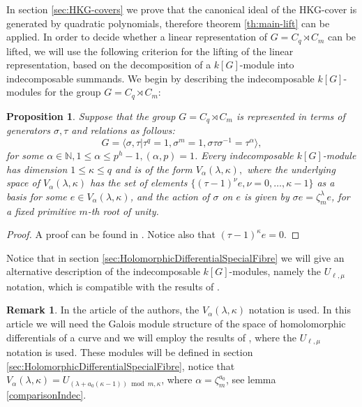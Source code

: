 \documentclass[11pt,letterpaper]{amsart}
\newtheorem{proposition}[theorem]{Proposition}
\theoremstyle{definition}
\newtheorem{remark}[theorem]{Remark}
\DeclareMathOperator\Aut{Aut}
\renewcommand{\mod}{\bmod}
\begin{document}
In section \ref{sec:HKG-covers} we prove that the canonical ideal of the HKG-cover is  generated by quadratic polynomials, therefore theorem \ref{th:main-lift} can be applied. In order to decide whether a linear representation of $G=C_q \rtimes C_m$ can be lifted, we will use the following criterion for the lifting of the linear representation, based on the decomposition of a $k[G]$-module into indecomposable summands. We begin  by describing the indecomposable 
$k[G]$-modules for the group $G=C_q \rtimes C_m$:
\begin{proposition}
Suppose that the group  $G=C_q \rtimes C_m$ is represented in terms of generators $\sigma,\tau$ and relations as follows:
\[
G=\langle \sigma,\tau | \tau^q=1, \sigma^m=1, \sigma \tau \sigma^{-1}= \tau^{\alpha}\rangle,
\]
for some  $\alpha\in \mathbb{N},
 1\leq \alpha \leq p^h-1, (\alpha, p)=1$.
Every indecomposable $k[G]$-module has dimension $1\leq \kappa \leq q$ and is of the form 
$
  V_{\alpha}(\lambda,\kappa),
$
where the underlying space of $V_{\alpha}(\lambda,\kappa)$ has the set of elements $\{(\tau-1)^\nu e, \nu=0,\ldots,\kappa-1\}$ as a basis for some $e\in V_\alpha(\lambda,\kappa)$, and the action of $\sigma$ on $e$ is given by $\sigma e= \zeta_m^\lambda e$, for a fixed primitive $m$-th root of unity. 
\end{proposition} 
\begin{proof}
A proof can be found in \cite[sec. 3]{MR4779377}. Notice also that $(\tau-1)^{\kappa}e=0$.
\end{proof}

Notice that in section \ref{sec:HolomorphicDifferentialSpecialFibre} we will give an alternative description of the indecomposable $k[G]$-modules, namely the $U_{\ell,\mu}$ notation, which is compatible with the results of \cite{MR4130074}.
\begin{remark}
In the article \cite{MR4779377} of the authors, the $V_{\alpha}(\lambda,\kappa)$ notation is used. In this article we will need the Galois module structure of the space of homolomorphic differentials of a curve and we will employ the results of 
\cite{MR4130074}, where the $U_{\ell,\mu}$ notation is used. These modules will be defined in section \ref{sec:HolomorphicDifferentialSpecialFibre}, notice that 
$V_{\alpha}(\lambda,\kappa)=U_{(\lambda+a_0(\kappa-1)) \mod m,\kappa}$, where $\alpha = \zeta_m^{a_0}$, see lemma \ref{comparisonIndec}.
\end{remark}
\end{document}
